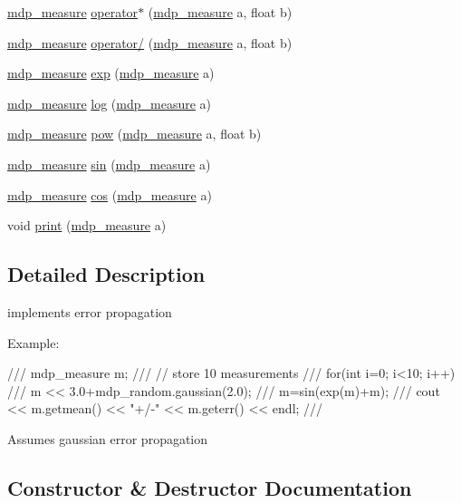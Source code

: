 \begin{DoxyCompactItemize}
\item 
\hyperlink{classmdp__measure}{mdp\+\_\+measure} \hyperlink{classmdp__measure_aa5dcdce1ad85ba147460781e805dae6d}{operator$\ast$} (\hyperlink{classmdp__measure}{mdp\+\_\+measure} a, float b)
\item 
\hyperlink{classmdp__measure}{mdp\+\_\+measure} \hyperlink{classmdp__measure_ae62ef8561fd82d07834885f6c7569a23}{operator/} (\hyperlink{classmdp__measure}{mdp\+\_\+measure} a, float b)
\item 
\hyperlink{classmdp__measure}{mdp\+\_\+measure} \hyperlink{classmdp__measure_aa27ae5954c296694bf711dbec8fb312a}{exp} (\hyperlink{classmdp__measure}{mdp\+\_\+measure} a)
\item 
\hyperlink{classmdp__measure}{mdp\+\_\+measure} \hyperlink{classmdp__measure_a4762a50b84b4f961dd46f2bb395b2506}{log} (\hyperlink{classmdp__measure}{mdp\+\_\+measure} a)
\item 
\hyperlink{classmdp__measure}{mdp\+\_\+measure} \hyperlink{classmdp__measure_adcca585e0856bb912b8069aaf56f9d95}{pow} (\hyperlink{classmdp__measure}{mdp\+\_\+measure} a, float b)
\item 
\hyperlink{classmdp__measure}{mdp\+\_\+measure} \hyperlink{classmdp__measure_a7889df6f1c1f8cfd6cb9aa0a3f9a2ec9}{sin} (\hyperlink{classmdp__measure}{mdp\+\_\+measure} a)
\item 
\hyperlink{classmdp__measure}{mdp\+\_\+measure} \hyperlink{classmdp__measure_af1f3876a19982932b4c6a1011f049350}{cos} (\hyperlink{classmdp__measure}{mdp\+\_\+measure} a)
\item 
void \hyperlink{classmdp__measure_a2974468f862cb8c3fe0a0034a4bd2e08}{print} (\hyperlink{classmdp__measure}{mdp\+\_\+measure} a)
\end{DoxyCompactItemize}


\subsection{Detailed Description}
implements error propagation 

Example\+: \begin{DoxyVerb}///    mdp_measure m;
///    // store 10 measurements
///    for(int i=0; i<10; i++) 
///       m << 3.0+mdp_random.gaussian(2.0);
///    m=sin(exp(m)+m);
///    cout << m.getmean() << "+/-" << m.geterr() << endl;
/// \end{DoxyVerb}
 Assumes gaussian error propagation 

\subsection{Constructor \& Destructor Documentation}
\mbox{\label{classmdp__measure_a27caa03e148574a5e3e13b587212bc6a}} 
